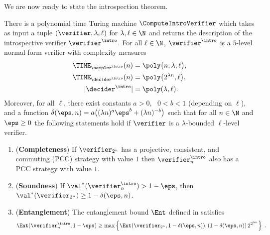 We are now ready to state the introspection theorem.

\begin{theorem}
  \label{thm:introspection}
  There is a polynomial time Turing machine $\ComputeIntroVerifier$ which takes
  as input a tuple $(\verifier, \lambda, \ell)$ for $\lambda, \ell \in \N$ and
  returns the description of the introspective verifier $\vint$.
  For all $\ell \in \N$, $\vint$ is a $5$-level normal-form verifier
  with complexity measures
  \begin{equation*}
    \begin{split}
      \TIME_{\sint}(n) & = \poly \big (n, \lambda, \ell \big),\\
      \TIME_{\dint}(n) & = \poly \big (2^{\lambda n}, \ell \big),\\
      |\dint| &= \poly(\lambda,\ell).
    \end{split}
  \end{equation*}
  Moreover, for all $\ell$, there exist constants $a>0$, \, $0 < b < 1$ (depending on $\ell$),
  and a function $\delta(\eps, n) = a \bigl( (\lambda n)^a\eps^b + (\lambda
  n)^{-b} \bigr)$ such that for all $n \in \N$ and $\eps \ge 0$ the following
  statements hold if $\verifier$ is a $\lambda$-bounded $\ell$-level verifier.
  \begin{enumerate}
  \item (\textbf{Completeness}) If $\verifier_{2^n}$ has a projective, consistent,
    and commuting (PCC) strategy with value $1$ then $\vint_n$ also
    has a PCC strategy with value $1$.

  \item (\textbf{Soundness}) If $\val^*(\vint_n) > 1 - \eps$, then
    $\val^*(\verifier_{2^n}) \geq 1 - \delta(\eps,n)$.
  \item (\textbf{Entanglement}) The entanglement bound $\Ent$ defined
    in  satisfies
    \begin{equation*}
      \Ent(\vint_n, 1 - \eps) \geq \max
      \left \{ \Ent(\verifier_{2^n}, 1 - \delta(\eps,n)),
        (1 - \delta(\eps,n))\, 2^{2^{\lambda n}} \right \}\;.
    \end{equation*}
  \end{enumerate}
\end{theorem}

